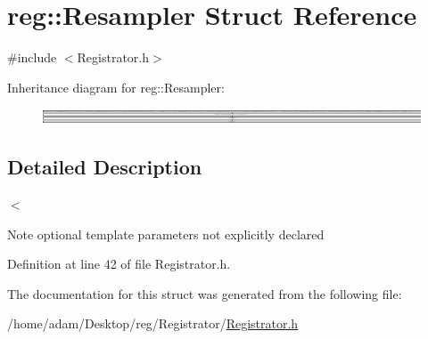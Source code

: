 \hypertarget{structreg_1_1_resampler}{}\section{reg\+:\+:Resampler Struct Reference}
\label{structreg_1_1_resampler}


{\ttfamily \#include $<$Registrator.\+h$>$}

Inheritance diagram for reg\+:\+:Resampler\+:\begin{figure}[H]
\begin{center}
\leavevmode
\includegraphics[height=0.448628cm]{structreg_1_1_resampler}
\end{center}
\end{figure}


\subsection{Detailed Description}
$<$ \begin{DoxyNote}{Note}
optional template parameters not explicitly declared 
\end{DoxyNote}


Definition at line 42 of file Registrator.\+h.



The documentation for this struct was generated from the following file\+:\begin{DoxyCompactItemize}
\item 
/home/adam/\+Desktop/reg/\+Registrator/\hyperlink{_registrator_8h}{Registrator.\+h}\end{DoxyCompactItemize}
